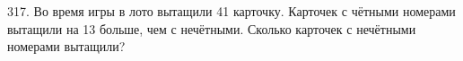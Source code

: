 317. Во время игры в лото вытащили 41 карточку. Карточек с чётными номерами вытащили на 13 больше, чем с нечётными. Сколько карточек с нечётными номерами вытащили?\\
